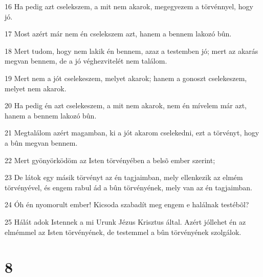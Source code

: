 \par 16 Ha pedig azt cselekszem, a mit nem akarok, megegyezem a törvénnyel, hogy jó.
\par 17 Most azért már nem én cselekszem azt, hanem a bennem lakozó bûn.
\par 18 Mert tudom, hogy nem lakik én bennem, azaz a testemben jó; mert az akarás megvan bennem, de a jó véghezvitelét nem találom.
\par 19 Mert nem a jót cselekeszem, melyet akarok; hanem a gonoszt cselekeszem, melyet nem akarok.
\par 20 Ha pedig én azt cselekeszem, a mit nem akarok, nem én mívelem már azt, hanem a bennem lakozó bûn.
\par 21 Megtalálom azért magamban, ki a jót akarom cselekedni, ezt a törvényt, hogy a bûn megvan bennem.
\par 22 Mert gyönyörködöm az Isten törvényében a belsõ ember szerint;
\par 23 De látok egy másik törvényt az én tagjaimban, mely ellenkezik az elmém törvényével, és engem rabul ád a bûn törvényének, mely van az én tagjaimban.
\par 24 Óh én nyomorult ember! Kicsoda szabadít meg engem e halálnak testébõl?
\par 25 Hálát adok Istennek a mi Urunk Jézus Krisztus által. Azért jóllehet én az elmémmel az Isten törvényének, de testemmel a bûn törvényének szolgálok.

\chapter{8}

